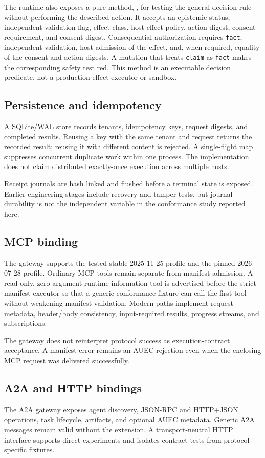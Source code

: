 The runtime also exposes a pure method, , for testing the general decision rule without performing the described action. It accepts an epistemic status, independent-validation flag, effect class, host effect policy, action digest, consent requirement, and consent digest. Consequential authorization requires \texttt{fact}, independent validation, host admission of the effect, and, when required, equality of the consent and action digests. A mutation that treats \texttt{claim} as \texttt{fact} makes the corresponding safety test red. This method is an executable decision predicate, not a production effect executor or sandbox.

\subsection{Persistence and idempotency}
A SQLite/WAL store records tenants, idempotency keys, request digests, and completed results. Reusing a key with the same tenant and request returns the recorded result; reusing it with different content is rejected. A single-flight map suppresses concurrent duplicate work within one process. The implementation does not claim distributed exactly-once execution across multiple hosts.

Receipt journals are hash linked and flushed before a terminal state is exposed. Earlier engineering stages include recovery and tamper tests, but journal durability is not the independent variable in the conformance study reported here.

\subsection{MCP binding}
The gateway supports the tested stable 2025-11-25 profile and the pinned 2026-07-28 profile. Ordinary MCP tools remain separate from manifest admission. A read-only, zero-argument runtime-information tool is advertised before the strict manifest executor so that a generic conformance fixture can call the first tool without weakening manifest validation. Modern paths implement request metadata, header/body consistency, input-required results, progress streams, and subscriptions.

The gateway does not reinterpret protocol success as execution-contract acceptance. A manifest error remains an AUEC rejection even when the enclosing MCP request was delivered successfully.

\subsection{A2A and HTTP bindings}
The A2A gateway exposes agent discovery, JSON-RPC and HTTP+JSON operations, task lifecycle, artifacts, and optional AUEC metadata. Generic A2A messages remain valid without the extension. A transport-neutral HTTP interface supports direct experiments and isolates contract tests from protocol-specific fixtures.

